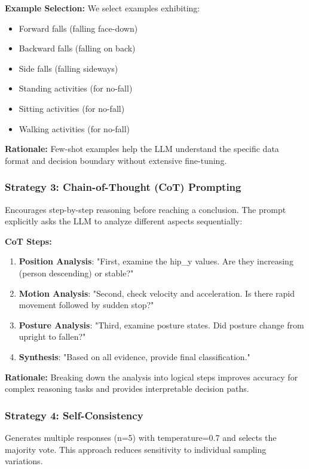 \documentclass[conference]{IEEEtran}
\begin{document}
\textbf{Example Selection:} We select examples exhibiting:
\begin{itemize}[leftmargin=*]
    \item Forward falls (falling face-down)
    \item Backward falls (falling on back)
    \item Side falls (falling sideways)
    \item Standing activities (for no-fall)
    \item Sitting activities (for no-fall)
    \item Walking activities (for no-fall)
\end{itemize}

\textbf{Rationale:} Few-shot examples help the LLM understand the specific data format and decision boundary without extensive fine-tuning.

\subsubsection{Strategy 3: Chain-of-Thought (CoT) Prompting}
Encourages step-by-step reasoning before reaching a conclusion. The prompt explicitly asks the LLM to analyze different aspects sequentially:

\textbf{CoT Steps:}
\begin{enumerate}
    \item \textbf{Position Analysis}: "First, examine the hip\_y values. Are they increasing (person descending) or stable?"
    \item \textbf{Motion Analysis}: "Second, check velocity and acceleration. Is there rapid movement followed by sudden stop?"
    \item \textbf{Posture Analysis}: "Third, examine posture states. Did posture change from upright to fallen?"
    \item \textbf{Synthesis}: "Based on all evidence, provide final classification."
\end{enumerate}

\textbf{Rationale:} Breaking down the analysis into logical steps improves accuracy for complex reasoning tasks and provides interpretable decision paths.

\subsubsection{Strategy 4: Self-Consistency}
Generates multiple responses (n=5) with temperature=0.7 and selects the majority vote. This approach reduces sensitivity to individual sampling variations.
\end{document}
